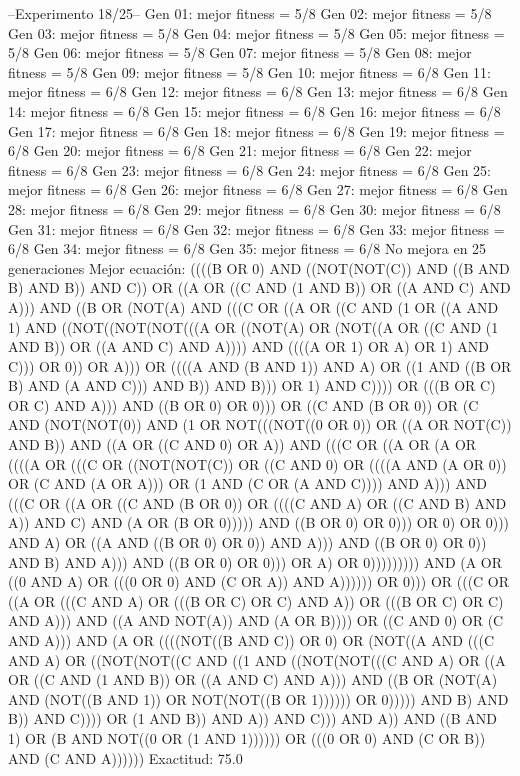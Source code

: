 --Experimento 
 18/25--
Gen 01: mejor fitness = 5/8
Gen 02: mejor fitness = 5/8
Gen 03: mejor fitness = 5/8
Gen 04: mejor fitness = 5/8
Gen 05: mejor fitness = 5/8
Gen 06: mejor fitness = 5/8
Gen 07: mejor fitness = 5/8
Gen 08: mejor fitness = 5/8
Gen 09: mejor fitness = 5/8
Gen 10: mejor fitness = 6/8
Gen 11: mejor fitness = 6/8
Gen 12: mejor fitness = 6/8
Gen 13: mejor fitness = 6/8
Gen 14: mejor fitness = 6/8
Gen 15: mejor fitness = 6/8
Gen 16: mejor fitness = 6/8
Gen 17: mejor fitness = 6/8
Gen 18: mejor fitness = 6/8
Gen 19: mejor fitness = 6/8
Gen 20: mejor fitness = 6/8
Gen 21: mejor fitness = 6/8
Gen 22: mejor fitness = 6/8
Gen 23: mejor fitness = 6/8
Gen 24: mejor fitness = 6/8
Gen 25: mejor fitness = 6/8
Gen 26: mejor fitness = 6/8
Gen 27: mejor fitness = 6/8
Gen 28: mejor fitness = 6/8
Gen 29: mejor fitness = 6/8
Gen 30: mejor fitness = 6/8
Gen 31: mejor fitness = 6/8
Gen 32: mejor fitness = 6/8
Gen 33: mejor fitness = 6/8
Gen 34: mejor fitness = 6/8
Gen 35: mejor fitness = 6/8
No mejora en 25 generaciones
Mejor ecuación: ((((B OR 0) AND ((NOT(NOT(C)) AND ((B AND B) AND B)) AND C)) OR ((A OR ((C AND (1 AND B)) OR ((A AND C) AND A))) AND ((B OR (NOT(A) AND (((C OR ((A OR ((C AND (1 OR ((A AND 1) AND ((NOT((NOT(NOT(((A OR ((NOT(A) OR (NOT((A OR ((C AND (1 AND B)) OR ((A AND C) AND A)))) AND ((((A OR 1) OR A) OR 1) AND C))) OR 0)) OR A))) OR ((((A AND (B AND 1)) AND A) OR ((1 AND ((B OR B) AND (A AND C))) AND B)) AND B))) OR 1) AND C)))) OR (((B OR C) OR C) AND A))) AND ((B OR 0) OR 0))) OR ((C AND (B OR 0)) OR (C AND (NOT(NOT(0)) AND (1 OR NOT(((NOT((0 OR 0)) OR ((A OR NOT(C)) AND B)) AND ((A OR ((C AND 0) OR A)) AND (((C OR ((A OR (A OR ((((A OR (((C OR ((NOT(NOT(C)) OR ((C AND 0) OR ((((A AND (A OR 0)) OR (C AND (A OR A))) OR (1 AND (C OR (A AND C)))) AND A))) AND (((C OR ((A OR ((C AND (B OR 0)) OR ((((C AND A) OR ((C AND B) AND A)) AND C) AND (A OR (B OR 0))))) AND ((B OR 0) OR 0))) OR 0) OR 0))) AND A) OR ((A AND ((B OR 0) OR 0)) AND A))) AND ((B OR 0) OR 0)) AND B) AND A))) AND ((B OR 0) OR 0))) OR A) OR 0))))))))) AND (A OR ((0 AND A) OR (((0 OR 0) AND (C OR A)) AND A)))))) OR 0))) OR (((C OR ((A OR (((C AND A) OR (((B OR C) OR C) AND A)) OR (((B OR C) OR C) AND A))) AND ((A AND NOT(A)) AND (A OR B)))) OR ((C AND 0) OR (C AND A))) AND (A OR ((((NOT((B AND C)) OR 0) OR (NOT((A AND (((C AND A) OR ((NOT(NOT((C AND ((1 AND ((NOT(NOT(((C AND A) OR ((A OR ((C AND (1 AND B)) OR ((A AND C) AND A))) AND ((B OR (NOT(A) AND (NOT((B AND 1)) OR NOT(NOT((B OR 1)))))) OR 0))))) AND B) AND B)) AND C)))) OR (1 AND B)) AND A)) AND C))) AND A)) AND ((B AND 1) OR (B AND NOT((0 OR (1 AND 1)))))) OR (((0 OR 0) AND (C OR B)) AND (C AND A))))))
 Exactitud: 75.0%

